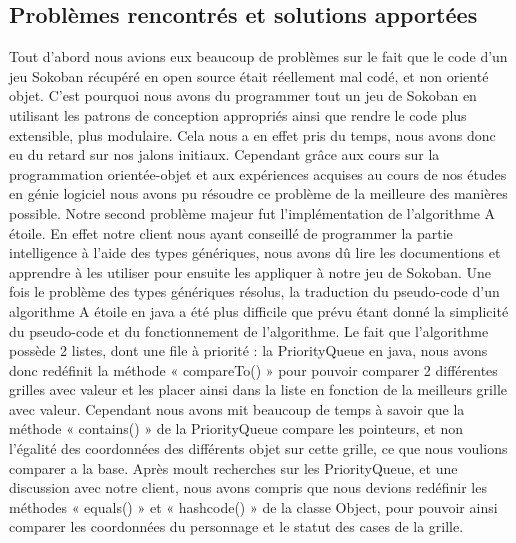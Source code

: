 \documentclass[a4paper,12pt]{article} %
\begin{document}
\subsection{Problèmes rencontrés et solutions apportées}
Tout d’abord nous avions eux beaucoup de problèmes sur le fait que le code d’un jeu Sokoban récupéré en open source était réellement mal codé, et non orienté objet.
\newline
C’est pourquoi nous avons du programmer tout un jeu de Sokoban en utilisant les patrons de conception appropriés ainsi que rendre le code plus extensible, plus modulaire. 
\newline
Cela nous a en effet pris du temps, nous avons donc eu du retard sur nos jalons initiaux. Cependant grâce aux cours sur la programmation orientée-objet et aux expériences acquises au cours de nos études en génie logiciel nous avons pu résoudre ce problème de la meilleure des manières possible.
\newline
Notre second problème majeur fut l’implémentation de l’algorithme A étoile. En effet notre client nous ayant conseillé de programmer la partie intelligence à l’aide des types génériques, nous avons dû lire les documentions et apprendre à les utiliser pour ensuite les appliquer à notre jeu de Sokoban. 
\newline\newline
Une fois le problème des types génériques résolus, la traduction du pseudo-code d’un algorithme A étoile en java a été plus difficile que prévu étant donné la simplicité du pseudo-code et du fonctionnement de l’algorithme.
\newline\newline
Le fait que l’algorithme possède 2 listes, dont une file à priorité : la PriorityQueue en java, nous avons donc redéfinit la méthode « compareTo() » pour pouvoir comparer 2 différentes grilles avec valeur et les placer ainsi dans la liste en fonction de la meilleurs grille avec valeur. 
\newline
Cependant nous avons mit beaucoup de temps à savoir que la méthode « contains() » de la PriorityQueue compare les pointeurs, et non l’égalité des coordonnées des différents objet sur cette grille, ce que nous voulions comparer a la base. 
\newline\newline
Après moult recherches sur les PriorityQueue, et une discussion avec notre client, nous avons compris que nous devions redéfinir les méthodes « equals() » et « hashcode() » de la classe Object, pour pouvoir ainsi comparer les coordonnées du personnage et le statut des cases de la grille.
\end{document}

